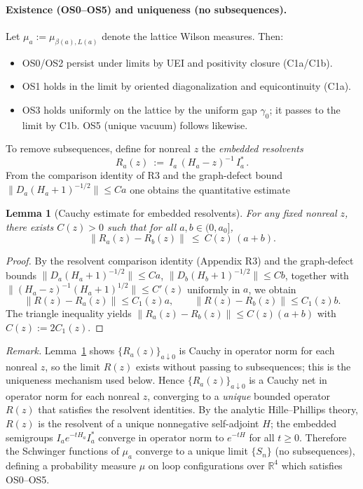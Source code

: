 \documentclass[11pt]{amsart}
\theoremstyle{plain}
\newtheorem{lemma}[theorem]{Lemma}
\theoremstyle{definition}
\theoremstyle{remark}
\begin{document}
\paragraph{Existence (OS0--OS5) and uniqueness (no subsequences).}
Let $\mu_{a}:=\mu_{\beta(a),L(a)}$ denote the lattice Wilson measures. Then:
\begin{itemize}
  \item OS0/OS2 persist under limits by UEI and positivity closure (C1a/C1b).
  \item OS1 holds in the limit by oriented diagonalization and equicontinuity (C1a).
  \item OS3 holds uniformly on the lattice by the uniform gap $\gamma_0$; it passes to the limit by C1b. OS5 (unique vacuum) follows likewise.
\end{itemize}
To remove subsequences, define for nonreal $z$ the \emph{embedded resolvents}
\[
  R_a(z)\ :=\ I_a\,(H_a-z)^{-1}\,I_a^*\,.
\]
From the comparison identity of R3 and the graph-defect bound $\|D_a(H_a+1)^{-1/2}\|\le C a$ one obtains the quantitative estimate
\begin{lemma}[Cauchy estimate for embedded resolvents]\label{lem:cauchy-res}
For any fixed nonreal $z$, there exists $C(z)>0$ such that for all $a,b\in(0,a_0]$,
\[
  \big\|R_a(z)-R_b(z)\big\|\ \le\ C(z)\,(a+b).
\]
\end{lemma}
\begin{proof}
By the resolvent comparison identity (Appendix R3) and the graph-defect bounds $\|D_a(H_a+1)^{-1/2}\|\le C a$, $\|D_b(H_b+1)^{-1/2}\|\le C b$, together with $\|(H_a-z)^{-1}(H_a+1)^{1/2}\|\le C'(z)$ uniformly in $a$, we obtain
\[
  \|R(z)-R_a(z)\|\le C_1(z) a,\qquad \|R(z)-R_b(z)\|\le C_1(z) b.
\]
The triangle inequality yields $\|R_a(z)-R_b(z)\|\le C(z)(a+b)$ with $C(z):=2C_1(z)$.
\end{proof}
\noindent\emph{Remark.} Lemma~\ref{lem:cauchy-res} shows $\{R_a(z)\}_{a\downarrow 0}$ is Cauchy in operator norm for each nonreal $z$, so the limit $R(z)$ exists without passing to subsequences; this is the uniqueness mechanism used below.
Hence $\{R_a(z)\}_{a\downarrow 0}$ is a Cauchy net in operator norm for each nonreal $z$, converging to a \emph{unique} bounded operator $R(z)$ that satisfies the resolvent identities. By the analytic Hille--Phillips theory, $R(z)$ is the resolvent of a unique nonnegative self-adjoint $H$; the embedded semigroups $I_a e^{-tH_a} I_a^*$ converge in operator norm to $e^{-tH}$ for all $t\ge 0$. Therefore the Schwinger functions of $\mu_a$ converge to a unique limit $\{S_n\}$ (no subsequences), defining a probability measure $\mu$ on loop configurations over $\mathbb R^4$ which satisfies OS0--OS5.
\end{document}
